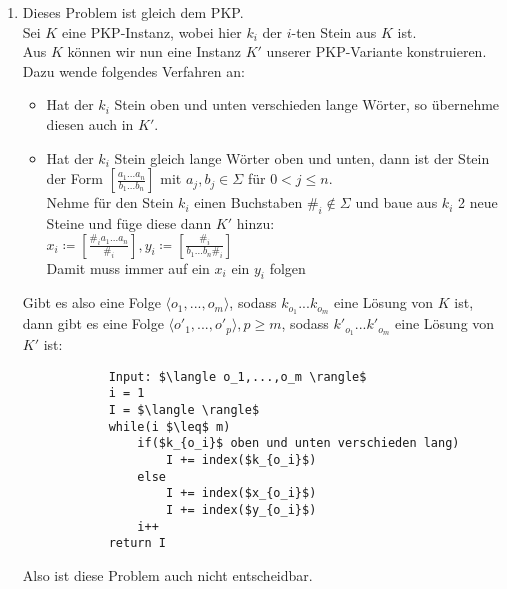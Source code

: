 \documentclass[a4paper,11pt]{scrartcl}
\begin{document}
\begin{enumerate}[label=\alph*)]
	\item	Dieses Problem ist gleich dem PKP.\\
			Sei $K$ eine PKP-Instanz, wobei hier $k_i$ der $i$-ten Stein aus $K$ ist.\\
			Aus $K$ können wir nun eine Instanz $K'$ unserer PKP-Variante konstruieren. Dazu wende folgendes Verfahren an:
			\begin{itemize}
			\item Hat der $k_i$ Stein oben und unten verschieden lange Wörter, so übernehme diesen auch in $K'$.
			\item Hat der $k_i$ Stein gleich lange Wörter oben und unten, dann ist der Stein der Form $\left[ \frac{a_1...a_n}{b_1...b_n} \right]$ mit $a_j, b_j \in \Sigma$ für $0<j\leq n$.\\
				  Nehme für den Stein $k_i$ einen Buchstaben $\#_i \not\in\Sigma$ und baue aus $k_i$ 2 neue Steine und füge diese dann $K'$ hinzu:\\
				  $x_i\coloneqq \left[ \frac{\#_ia_1...a_n}{\#_i} \right], y_i\coloneqq \left[ \frac{\#_i}{b_1...b_n\#_i} \right]$\\
				  Damit muss immer auf ein $x_i$ ein $y_i$ folgen
			\end{itemize}
			Gibt es also eine Folge $\langle o_1,...,o_m \rangle$, sodass $k_{o_1} ... k_{o_m}$ eine Lösung von $K$ ist, dann gibt es eine Folge $\langle o'_1,...,o'_p \rangle , p \geq m$, sodass $k'_{o_1} ... k'_{o_m}$ eine Lösung von $K'$ ist:
			\begin{lstlisting}
			Input: $\langle o_1,...,o_m \rangle$
			i = 1
			I = $\langle \rangle$
			while(i $\leq$ m)
				if($k_{o_i}$ oben und unten verschieden lang)
					I += index($k_{o_i}$)
				else
					I += index($x_{o_i}$)
					I += index($y_{o_i}$)
				i++
			return I
			\end{lstlisting}
			Also ist diese Problem auch nicht entscheidbar.
	\end{enumerate}
	
\end{document}
